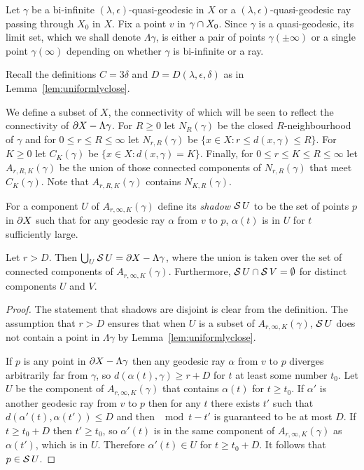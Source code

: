 Let $\gamma$ be a bi-infinite $(\lambda, \epsilon)$-quasi-geodesic in $X$ or a
$(\lambda, \epsilon)$-quasi-geodesic ray passing through $X_0$ in $X$.
Fix a point $v$ in $\gamma \cap X_0$. Since $\gamma$ is a
quasi-geodesic, its limit set, which we shall denote $\Lambda\gamma$, is either
a pair of points $\gamma(\pm\infty)$ or a single point $\gamma(\infty)$
depending on whether $\gamma$ is bi-infinite or a ray.

Recall the definitions $C = 3\delta$ and $D = D(\lambda, \epsilon, \delta)$ as
in Lemma~\ref{lem:uniformlyclose}. 

We define a subset of $X$, the connectivity of which will be seen to
reflect the connectivity of $\partial X - \Lambda \gamma$.  For $R \geq 0$ let
$N_R(\gamma)$ be the closed $R$-neighbourhood of $\gamma$ and for $0 \leq r
\leq R \leq \infty$ let $N_{r, R}(\gamma)$ be $\{x \in X \colon r \leq d(x,
\gamma) \leq R\}$. For $K \geq 0$ let $C_K(\gamma)$ be $\{x \in X \colon d(x,
\gamma) = K\}$. Finally, for $0 \leq r \leq K \leq R \leq \infty$ let $A_{r, R,
K}(\gamma)$ be the union of those connected components of $N_{r, R}(\gamma)$
that meet $C_K(\gamma)$. Note that $A_{r, R, K}(\gamma)$ contains $N_{K,
R}(\gamma)$.

For a component $U$ of $A_{r, \infty, K}(\gamma)$ define its \emph{shadow}
$\operatorname{\mathcal{S}} U$ to be the set of points $p$ in $\partial X$ such that for any
geodesic ray $\alpha$ from $v$ to $p$, $\alpha(t)$ is in $U$ for $t$ sufficiently
large. 

\begin{lem}\label{lem:disjointcoverbyshadows} Let $r > D$. Then
$\bigcup_U\operatorname{\mathcal{S}} U = \partial X - \Lambda\gamma$, where the union is
taken over the set of connected components of $A_{r, \infty, K}(\gamma)$.
Furthermore, $\operatorname{\mathcal{S}} U \cap \operatorname{\mathcal{S}} V = \emptyset$ for distinct
components $U$ and $V$.
\end{lem}

\begin{proof} The statement that shadows are disjoint is clear from the
  definition. The assumption that $r > D$ ensures that when $U$ is a subset of
  $A_{r, \infty, K}(\gamma)$, $\operatorname{\mathcal{S}} U$ does not contain a point in
  $\Lambda\gamma$ by Lemma~\ref{lem:uniformlyclose}. 

  If $p$ is any point in $\partial X - \Lambda\gamma$ then any geodesic ray
  $\alpha$ from $v$ to $p$ diverges arbitrarily far from $\gamma$, so
  $d(\alpha(t), \gamma) \geq r + D$ for $t$ at least some number $t_0$. Let $U$
  be the component of $A_{r, \infty, K}(\gamma)$ that contains $\alpha(t)$ for
  $t \geq t_0$.
  If $\alpha'$ is another geodesic ray from $v$ to $p$ then for any $t$ there
  exists $t'$ such that $d(\alpha'(t), \alpha(t')) \leq D$ and then $\mod{t -
  t'}$ is guaranteed to be at most $D$. If $t \geq t_0 + D$ then $t' \geq t_0$,
  so $\alpha'(t)$ is in the same component of $A_{r, \infty, K}(\gamma)$ as
  $\alpha(t')$, which is in $U$. Therefore $\alpha'(t) \in U$ for $t \geq t_0 +
  D$. It follows that $p \in \operatorname{\mathcal{S}} U$.\end{proof}


